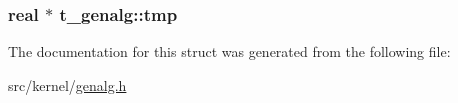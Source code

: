 \hypertarget{structt__genalg_a132ad6d9b56931a5ee331b923141c5c6}{
\subsubsection[{tmp}]{\setlength{\rightskip}{0pt plus 5cm}real $\ast$ {\bf t\-\_\-genalg\-::tmp}}}\label{structt__genalg_a132ad6d9b56931a5ee331b923141c5c6}


\-The documentation for this struct was generated from the following file\-:\begin{DoxyCompactItemize}
\item 
src/kernel/\hyperlink{genalg_8h}{genalg.\-h}\end{DoxyCompactItemize}
